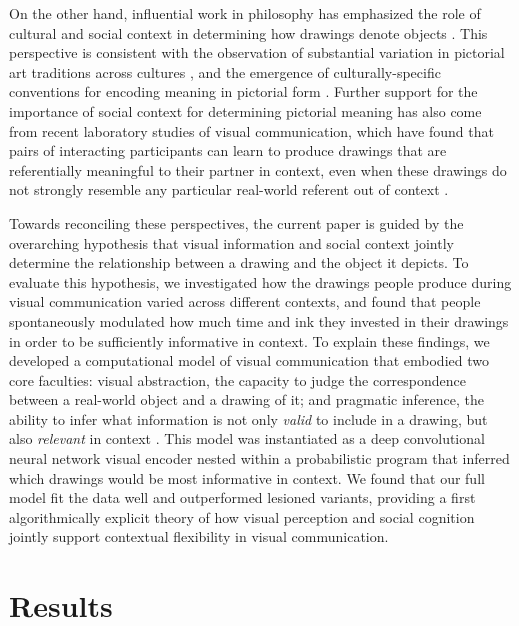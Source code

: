 \documentclass[9pt,twocolumn,twoside]{pnas-new}
\begin{document}
On the other hand, influential work in philosophy has emphasized the role of cultural and social context in determining how drawings denote objects \cite{goodman1976languages}.
This perspective is consistent with the observation of substantial variation in pictorial art traditions across cultures \cite{gombrich1989story,gombrich1969art}, and the emergence of culturally-specific conventions for encoding meaning in pictorial form \cite{boltz1994origin,allen2000middle}. 
Further support for the importance of social context for determining pictorial meaning has also come from recent laboratory studies of visual communication, which have found that pairs of interacting participants can learn to produce drawings that are referentially meaningful to their partner in context, even when these drawings do not strongly resemble any particular real-world referent out of context \cite{Garrod:2007wk,fay2010interactive,Galantucci:2005uh}. 

Towards reconciling these perspectives, the current paper is guided by the overarching hypothesis that visual information and social context jointly determine the relationship between a drawing and the object it depicts.  
To evaluate this hypothesis, we investigated how the drawings people produce during visual communication varied across different contexts, and found that people spontaneously modulated how much time and ink they invested in their drawings in order to be sufficiently informative in context.
To explain these findings, we developed a computational model of visual communication that embodied two core faculties: visual abstraction, the capacity to judge the correspondence between a real-world object and a drawing of it; and pragmatic inference, the ability to infer what information is not only \textit{valid} to include in a drawing, but also \textit{relevant} in context  \cite{goodman2016pragmatic,grice1975syntax,abell2009canny}.
This model was instantiated as a deep convolutional neural network visual encoder nested within a probabilistic program that inferred which drawings would be most informative in context.
We found that our full model fit the data well and outperformed lesioned variants, providing a first algorithmically explicit theory of how visual perception and social cognition jointly support contextual flexibility in visual communication.

\section*{Results}
\end{document}
